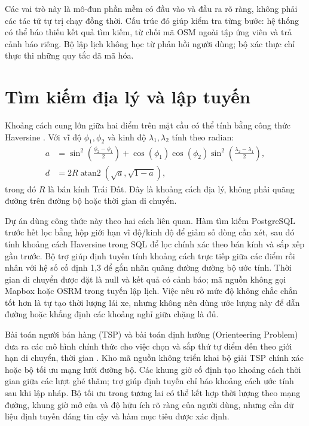 Các vai trò này là mô-đun phần mềm có đầu vào và đầu ra rõ ràng, không phải các tác tử tự trị chạy đồng thời. Cấu trúc đó giúp kiểm tra từng bước: hệ thống có thể báo thiếu kết quả tìm kiếm, từ chối mã OSM ngoài tập ứng viên và trả cảnh báo riêng. Bộ lập lịch không học từ phản hồi người dùng; bộ xác thực chỉ thực thi những quy tắc đã mã hóa.

\section{Tìm kiếm địa lý và lập tuyến}

Khoảng cách cung lớn giữa hai điểm trên mặt cầu có thể tính bằng công thức Haversine \cite{sinnott1984virtues}. Với vĩ độ $\phi_1,\phi_2$ và kinh độ $\lambda_1,\lambda_2$ tính theo radian:
\begin{align}
    a &= \sin^2\left(\frac{\phi_2-\phi_1}{2}\right)
       + \cos(\phi_1)\cos(\phi_2)
         \sin^2\left(\frac{\lambda_2-\lambda_1}{2}\right),\\
    d &= 2R\operatorname{atan2}\left(\sqrt{a},\sqrt{1-a}\right),
\end{align}
trong đó $R$ là bán kính Trái Đất. Đây là khoảng cách địa lý, không phải quãng đường trên đường bộ hoặc thời gian di chuyển.

Dự án dùng công thức này theo hai cách liên quan. Hàm tìm kiếm PostgreSQL trước hết lọc bằng hộp giới hạn vĩ độ/kinh độ để giảm số dòng cần xét, sau đó tính khoảng cách Haversine trong SQL để lọc chính xác theo bán kính và sắp xếp gần trước. Bộ trợ giúp định tuyến tính khoảng cách trực tiếp giữa các điểm rồi nhân với hệ số cố định 1,3 để gắn nhãn quãng đường đường bộ ước tính. Thời gian di chuyển được đặt là null và kết quả có cảnh báo; mã nguồn không gọi Mapbox hoặc OSRM trong tuyến lập lịch. Việc nêu rõ mức độ không chắc chắn tốt hơn là tự tạo thời lượng lái xe, nhưng không nên dùng ước lượng này để dẫn đường hoặc khẳng định các khoảng nghỉ giữa chặng là đủ.

Bài toán người bán hàng (TSP) và bài toán định hướng (Orienteering Problem) đưa ra các mô hình chính thức cho việc chọn và sắp thứ tự điểm đến theo giới hạn di chuyển, thời gian \cite{applegate2006traveling,vansteenwegen2011orienteering}. Kho mã nguồn không triển khai bộ giải TSP chính xác hoặc bộ tối ưu mạng lưới đường bộ. Các khung giờ cố định tạo khoảng cách thời gian giữa các lượt ghé thăm; trợ giúp định tuyến chỉ báo khoảng cách ước tính sau khi lập nháp. Bộ tối ưu trong tương lai có thể kết hợp thời lượng theo mạng đường, khung giờ mở cửa và độ hữu ích rõ ràng của người dùng, nhưng cần dữ liệu định tuyến đáng tin cậy và hàm mục tiêu được xác định.

